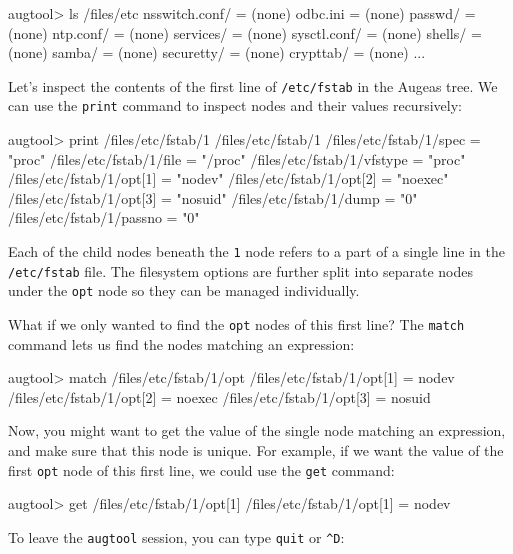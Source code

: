 \begin{augtoolsh}[]
augtool> ls /files/etc
nsswitch.conf/ = (none)
odbc.ini = (none)
passwd/ = (none)
ntp.conf/ = (none)
services/ = (none)
sysctl.conf/ = (none)
shells/ = (none)
samba/ = (none)
securetty/ = (none)
crypttab/ = (none)
...
\end{augtoolsh}


Let's inspect the contents of the first line of \texttt{/etc/fstab} in the Augeas tree. We can use the \verb!print! command to inspect nodes and their values recursively:

\begin{augtoolsh}[]
augtool> print /files/etc/fstab/1
/files/etc/fstab/1
/files/etc/fstab/1/spec = "proc"
/files/etc/fstab/1/file = "/proc"
/files/etc/fstab/1/vfstype = "proc"
/files/etc/fstab/1/opt[1] = "nodev"
/files/etc/fstab/1/opt[2] = "noexec"
/files/etc/fstab/1/opt[3] = "nosuid"
/files/etc/fstab/1/dump = "0"
/files/etc/fstab/1/passno = "0"
\end{augtoolsh}

Each of the child nodes beneath the \verb!1! node refers to a part of a single line in the \texttt{/etc/fstab} file. The filesystem options are further split into separate nodes under the \verb!opt! node so they can be managed individually.

What if we only wanted to find the \verb!opt! nodes of this first line? The \verb!match! command lets us find the nodes matching an expression:


\begin{augtoolsh}[]
augtool> match /files/etc/fstab/1/opt
/files/etc/fstab/1/opt[1] = nodev
/files/etc/fstab/1/opt[2] = noexec
/files/etc/fstab/1/opt[3] = nosuid
\end{augtoolsh}

Now, you might want to get the value of the single node matching an expression, and make sure that this node is unique. For example, if we want the value of the first \verb!opt! node of this first line, we could use the \verb!get! command:

\begin{augtoolsh}[]
augtool> get /files/etc/fstab/1/opt[1]
/files/etc/fstab/1/opt[1] = nodev
\end{augtoolsh}


To leave the \verb!augtool! session, you can type \verb!quit! or \verb!^D!:

